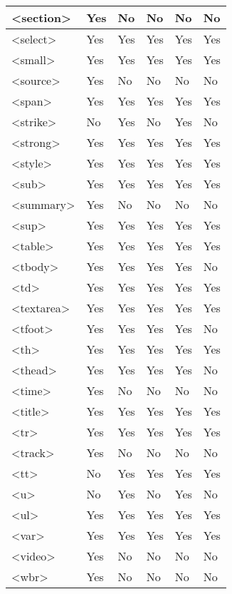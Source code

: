 \begin{longtable}{|l|l|l|l|l|l|}
<section>			&Yes	&No				&No		&No					&No		\\
\hline
<select>			&Yes	&Yes			&Yes	&Yes				&Yes	\\
\hline
<small>			&Yes	&Yes			&Yes	&Yes				&Yes	\\
\hline
<source>			&Yes	&No				&No		&No					&No		\\
\hline
<span>			&Yes	&Yes			&Yes	&Yes				&Yes	\\
\hline
<strike>			&No		&Yes			&No		&Yes				&No		\\
\hline
<strong>			&Yes	&Yes			&Yes	&Yes				&Yes	\\
\hline
<style>			&Yes	&Yes			&Yes	&Yes				&Yes	\\
\hline
<sub>			&Yes	&Yes			&Yes	&Yes				&Yes	\\
\hline
<summary>		&Yes	&No				&No		&No					&No		\\
\hline
<sup>			&Yes	&Yes			&Yes	&Yes				&Yes	\\
\hline
<table>			&Yes	&Yes			&Yes	&Yes				&Yes	\\
\hline
<tbody>			&Yes	&Yes			&Yes	&Yes				&No		\\
\hline
<td>				&Yes	&Yes			&Yes	&Yes				&Yes	\\
\hline
<textarea>		&Yes	&Yes			&Yes	&Yes				&Yes	\\
\hline
<tfoot>			&Yes	&Yes			&Yes	&Yes				&No		\\
\hline
<th>				&Yes	&Yes			&Yes	&Yes				&Yes	\\
\hline
<thead>			&Yes	&Yes			&Yes	&Yes				&No		\\
\hline
<time>			&Yes	&No				&No		&No					&No		\\
\hline
<title>			&Yes	&Yes			&Yes	&Yes				&Yes	\\
\hline
<tr>				&Yes	&Yes			&Yes	&Yes				&Yes	\\
\hline
<track>			&Yes	&No				&No		&No					&No		\\
\hline
<tt>				&No		&Yes			&Yes	&Yes				&Yes	\\
\hline
<u>				&No		&Yes			&No		&Yes				&No		\\
\hline
<ul>				&Yes	&Yes			&Yes	&Yes				&Yes	\\
\hline
<var>			&Yes	&Yes			&Yes	&Yes				&Yes	\\
\hline
<video>			&Yes	&No				&No		&No					&No		\\
\hline
<wbr>			&Yes	&No				&No		&No					&No		\\
\hline
\end{longtable}



